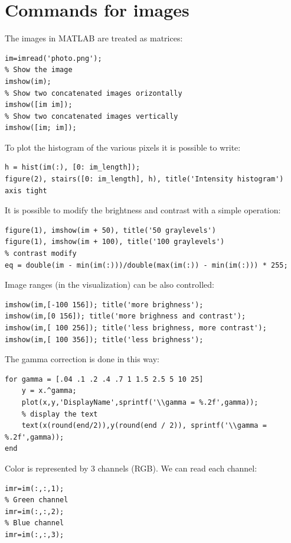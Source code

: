 \documentclass[12pt, a4paper]{report}
\newtheorem[style=M,bodystyle=\normalfont]{theorem}{Theorem}
\newtheorem[style=M,bodystyle=\normalfont]{corollary}{Corollary}
\newtheorem[style=M,bodystyle=\normalfont]{lemma}{Lemma}
\newtheorem[style=M,bodystyle=\normalfont]{definition}{Definition}
\begin{document}
    \section{Commands for images}
    The images in MATLAB are treated as matrices:
    \begin{lstlisting}[frame=single, numbers=none, style=Matlab-bw]
im=imread('photo.png');
% Show the image
imshow(im);
% Show two concatenated images orizontally
imshow([im im]);
% Show two concatenated images vertically
imshow([im; im]);
    \end{lstlisting}
    To plot the histogram of the various pixels it is possible to write: 
    \begin{lstlisting}[frame=single, numbers=none, style=Matlab-bw]
h = hist(im(:), [0: im_length]);
figure(2), stairs([0: im_length], h), title('Intensity histogram')
axis tight
    \end{lstlisting}
    It is possible to modify the brightness and contrast with a simple operation:
    \begin{lstlisting}[frame=single, numbers=none, style=Matlab-bw]
figure(1), imshow(im + 50), title('50 graylevels')
figure(1), imshow(im + 100), title('100 graylevels')
% contrast modify
eq = double(im - min(im(:)))/double(max(im(:)) - min(im(:))) * 255;
    \end{lstlisting}
    Image ranges (in the visualization) can be also controlled:
    \begin{lstlisting}[frame=single, numbers=none, style=Matlab-bw]
imshow(im,[-100 156]); title('more brighness');
imshow(im,[0 156]); title('more brighness and contrast');
imshow(im,[ 100 256]); title('less brighness, more contrast');
imshow(im,[ 100 356]); title('less brighness');
    \end{lstlisting}
    The gamma correction is done in this way: 
    \begin{lstlisting}[frame=single, numbers=none, style=Matlab-bw]
for gamma = [.04 .1 .2 .4 .7 1 1.5 2.5 5 10 25]
    y = x.^gamma;
    plot(x,y,'DisplayName',sprintf('\\gamma = %.2f',gamma));
    % display the text
    text(x(round(end/2)),y(round(end / 2)), sprintf('\\gamma = %.2f',gamma));
end
    \end{lstlisting}
    Color is represented by 3 channels (RGB). We can read each channel:
    \begin{lstlisting}[frame=single, numbers=none, style=Matlab-bw]
% Red channel
imr=im(:,:,1);
% Green channel
imr=im(:,:,2);
% Blue channel
imr=im(:,:,3);
    \end{lstlisting}
\end{document}

